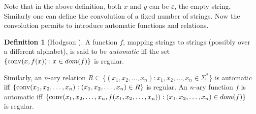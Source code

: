 \documentclass{LMCS}
\theoremstyle{plain}\newtheorem{athm}[thm]{Theorem}
\theoremstyle{plain}\newtheorem{aprop}[thm]{Proposition}
\theoremstyle{plain}\newtheorem{aprob}[thm]{Open Problem}
\theoremstyle{plain}\newtheorem{acor}[thm]{Corollary}
\theoremstyle{plain}\newtheorem{alem}[thm]{Lemma}
\theoremstyle{definition}\newtheorem{adefn}[thm]{Definition}
\theoremstyle{definition}\newtheorem{arem}[thm]{Remark}
\theoremstyle{plain}\newtheorem{aexmp}[thm]{Example}
\theoremstyle{plain}\newtheorem{aclm}[thm]{Claim}
\def\conv{{\rm{conv}}}
\begin{document}
\noindent
Note that in the above definition, both $x$ and $y$ can be $\varepsilon$,
the empty string.
Similarly one can define the
convolution of a fixed number of strings. Now the convolution permits
to introduce automatic functions and relations.

\begin{adefn}[Hodgson \cite{Ho76,Ho83}]
\rm A function $f$, mapping strings to strings
(possibly over a different alphabet), is said to be 
{\em automatic} iff the set
$\{\conv(x,f(x)): x \in dom(f)\}$ is regular.

Similarly, an $n$-ary relation
$R \subseteq \{(x_1,x_2,\ldots,x_n): x_1,x_2,\ldots,x_n \in \Sigma^*\}$ is
automatic iff
$\{\conv(x_1,x_2,\ldots,x_n): (x_1,x_2,\ldots,x_n) \in R\}$ is
regular. An $n$-ary function $f$ is automatic iff
$\{\conv(x_1,x_2,\ldots,x_n,f(x_1,x_2,\ldots,x_n)): 
(x_1,x_2,\ldots,x_n) \in dom(f)\}$ is regular.
\end{adefn}
\end{document}
